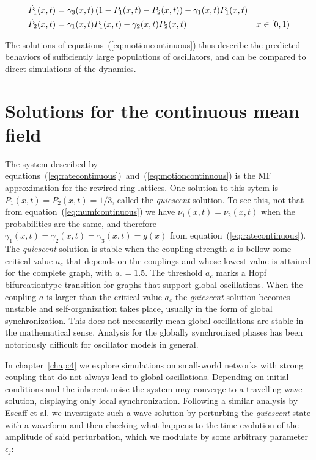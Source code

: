 \begin{align}
    \dot{P_1}(x,t) &= \gamma_3(x,t)\left(1-P_1(x,t)-P_2(x,t)\right) - \gamma_1(x,t)P_1(x,t) & \notag\\
    \dot{P_2}(x,t) &= \gamma_1(x,t)P_1(x,t) - \gamma_2(x,t)P_2(x,t) & x\in[0,1)
    \label{eq:motioncontinuous}
\end{align}

The solutions of equations~(\ref{eq:motioncontinuous}) thus describe the predicted behaviors of sufficiently large populations of
oscillators, and can be compared to direct simulations of the dynamics.

\section{Solutions for the continuous mean field}

The system described by equations~(\ref{eq:ratecontinuous})~and~(\ref{eq:motioncontinuous}) is the MF approximation for the rewired
ring lattices. One solution to this sytem is $P_1(x,t)=P_2(x,t)=1/3$, called the \textit{quiescent} solution. To see this, not that
from equation~(\ref{eq:numfcontinuous}) we have $\nu_1(x,t) = \nu_2(x,t)$ when the probabilities are the same, and therefore
$\gamma_1(x,t) = \gamma_2(x,t) = \gamma_3(x,t)=g(x)$ from equation~(\ref{eq:ratecontinuous}). The \textit{quiescent} solution is stable
when the coupling strength $a$ is bellow some critical value $a_c$ that depends on the couplings and whose lowest value is attained for
the complete graph, with $a_c=1.5$. The threshold $a_c$ marks a Hopf bifurcation\footnotemark type transition for graphs that support
global oscillations\cite{Wood06a}\cite{rodrigues2020synchronization}\cite{Wood06b}\cite{Wood07b}. When the coupling $a$ is larger than
the critical value $a_c$ the \textit{quiescent} solution becomes unstable and self-organization takes place, usually in the form of
global synchronization. This does not necessarily mean global oscillations are stable in the mathematical sense. Analysis for the
globally synchronized phases has been notoriously difficult for oscillator models in general.


In chapter~\ref{chap:4} we explore simulations on small-world networks with strong coupling that do not always lead to global
oscillations. Depending on initial conditions and the inherent noise the system may converge to a travelling wave solution, displaying
only local synchronization. Following a similar analysis by Escaff et al.\cite{escaff2014arrays} we investigate such a wave solution by
perturbing the \textit{quiescent} state with a waveform and then checking what happens to the time evolution of the amplitude of said
perturbation, which we modulate by some arbitrary parameter $\epsilon_j$:

